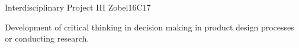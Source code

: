 \begin{syllabus}
\begin{unit}{Interdisciplinary Project  III }{}{Zobel}{16}{C17}
\begin{learningoutcomes}
   \item Development of critical thinking in decision making in product design processes or conducting research.
\end{learningoutcomes}
\end{unit}

\begin{coursebibliography}
\end{coursebibliography}

\end{syllabus}
